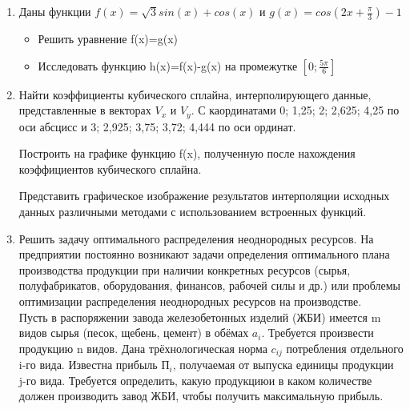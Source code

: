 \documentclass[russian,utf8,nocolumnxxxi,nocolumnxxxii]{eskdtext}
\begin{document}
\begin{enumerate}
\item Даны функции $f(x)=\sqrt{3}sin(x)+cos(x)$ и $g(x)=cos(2x+\frac{\pi}{3})-1$
\begin{itemize}
  \item Решить уравнение f(x)=g(x)
  \item Исследовать функцию h(x)=f(x)-g(x) на промежутке $[0;\frac{5\pi}{6}]$
\end{itemize}
\item Найти коэффициенты кубического сплайна, интерполирующего данные, представленные в векторах $V_x$ и $V_y$. С каординатами  0; 1,25; 2; 2,625; 4,25 по оси абсцисс и 3; 2,925; 3,75; 3,72; 4,444 по оси ординат.%

Построить на графике функцию f(x), полученную после нахождения коэффициентов кубического сплайна.

Представить графическое изображение результатов интерполяции исходных данных различными методами с использованием встроенных функций.
\item Решить задачу оптимального распределения неоднородных ресурсов. На предприятии постоянно возникают задачи определения оптимального плана производства продукции при наличии конкретных ресурсов (сырья, полуфабрикатов, оборудования, финансов, рабочей силы и др.) или проблемы оптимизации распределения неоднородных ресурсов на производстве.
\\Пусть в распоряжении завода железобетонных изделий (ЖБИ) имеется m видов сырья (песок, щебень, цемент) в обёмах $a_i$. Требуется произвести продукцию n видов. Дана трёхнологическая норма $c_{ij}$ потребления отдельного i-го вида. Известна прибыль $П_i$, получаемая от выпуска единицы продукции j-го вида. Требуется определить, какую продукциюи  в каком количестве должен производить завод ЖБИ, чтобы получить максимальную прибыль.
\end{enumerate}
\end{document}
